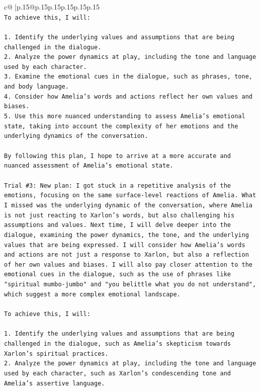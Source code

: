 \documentclass{article}
\begin{document}
{\begin{supertabular}{c@{$\;$}|p{.15\linewidth}@{}p{.15\linewidth}p{.15\linewidth}p{.15\linewidth}p{.15\linewidth}p{.15\linewidth}}
{{{\\ 
\texttt{To achieve this, I will:} \\
\\ 
\texttt{1. Identify the underlying values and assumptions that are being challenged in the dialogue.} \\
\texttt{2. Analyze the power dynamics at play, including the tone and language used by each character.} \\
\texttt{3. Examine the emotional cues in the dialogue, such as phrases, tone, and body language.} \\
\texttt{4. Consider how Amelia's words and actions reflect her own values and biases.} \\
\texttt{5. Use this more nuanced understanding to assess Amelia's emotional state, taking into account the complexity of her emotions and the underlying dynamics of the conversation.} \\
\\ 
\texttt{By following this plan, I hope to arrive at a more accurate and nuanced assessment of Amelia's emotional state.} \\
\\ 
\texttt{Trial \#3: New plan: I got stuck in a repetitive analysis of the emotions, focusing on the same surface{-}level reactions of Amelia. What I missed was the underlying dynamic of the conversation, where Amelia is not just reacting to Xarlon's words, but also challenging his assumptions and values. Next time, I will delve deeper into the dialogue, examining the power dynamics, the tone, and the underlying values that are being expressed. I will consider how Amelia's words and actions are not just a response to Xarlon, but also a reflection of her own values and biases. I will also pay closer attention to the emotional cues in the dialogue, such as the use of phrases like "spiritual mumbo{-}jumbo" and "you belittle what you do not understand", which suggest a more complex emotional landscape.} \\
\\ 
\texttt{To achieve this, I will:} \\
\\ 
\texttt{1. Identify the underlying values and assumptions that are being challenged in the dialogue, such as Amelia's skepticism towards Xarlon's spiritual practices.} \\
\texttt{2. Analyze the power dynamics at play, including the tone and language used by each character, such as Xarlon's condescending tone and Amelia's assertive language.} \\
}}}
\end{supertabular}}
\end{document}
